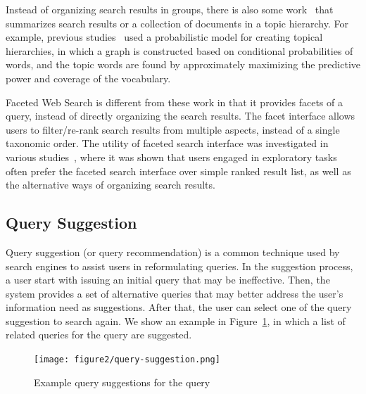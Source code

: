 
Instead of organizing search results in groups, there is also some work~\cite{lawrie2001finding,lawrie2003generating, nevill1999lexically} that summarizes search results or a collection of documents in a topic hierarchy. For example, previous studies~\cite{lawrie2001finding,lawrie2003generating} used a probabilistic model for creating topical hierarchies, in which a graph is constructed based on conditional probabilities of words, and the topic words are found by approximately maximizing the predictive power and coverage of the vocabulary.


Faceted Web Search is different from these work in that it provides facets of a query, instead of directly organizing the search results. The facet interface allows users to filter/re-rank search results from multiple aspects, instead of a single taxonomic order. The utility of faceted search interface was investigated in various studies~\cite{pollitt1998key,hearst2006clustering,pratt1999knowledge,yee2003faceted,kaki2005findex,rodden2001does}, where it was shown that users engaged in exploratory tasks often prefer the faceted search interface over simple ranked result list, as well as the alternative ways of organizing search results.

\subsection{Query Suggestion}
Query suggestion (or query recommendation) is a common technique used by search engines to assist users in reformulating queries. In the suggestion process, a user start with issuing an initial query that may be ineffective. Then, the system provides a set of alternative queries that may better address the user's information need as suggestions. After that, the user can select one of the query suggestion to search again. We show an example in Figure~\ref{fig:bg-qsuggestion}, in which a list of related queries for the query  are suggested.  

\vspace{+5mm}
\begin{figure}[!htbp]
\centering
\texttt{[image: figure2/query-suggestion.png]}
\caption{Example query suggestions for the query }
\label{fig:bg-qsuggestion}
\end{figure}

